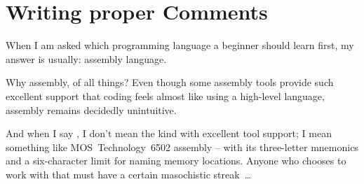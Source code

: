 \part{Writing proper Comments}\label{sec:WritingProperComments}









When I am asked which programming language a beginner should learn first, my answer is usually: assembly language.

Why assembly, of all things? Even though some assembly tools provide such excellent support that coding feels almost like using a high-level language, assembly remains decidedly unintuitive.

And when I say , I don't mean the kind with excellent tool support; I mean something like MOS~Technology~6502 \autocite{WIKIPEDIA:6502} assembly – with its three-letter mnemonics and a six-character limit for naming memory locations. Anyone who chooses to work with that must have a certain masochistic streak~…

